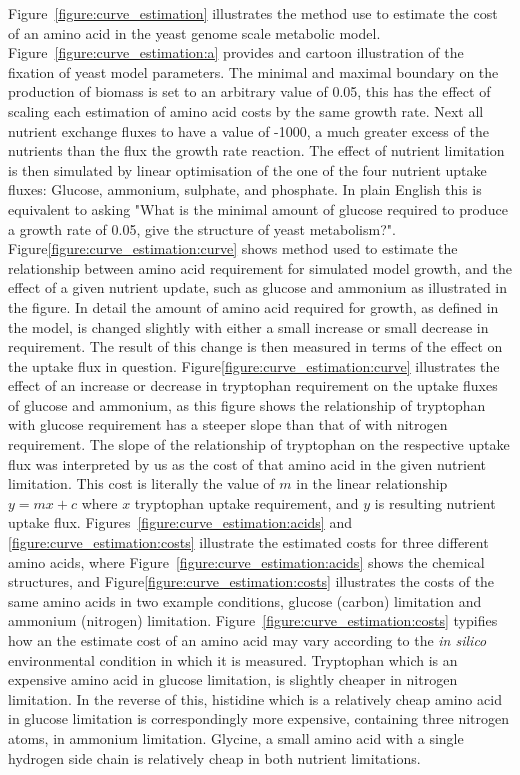Figure~\vref{figure:curve_estimation} illustrates the method use to estimate the cost of an amino acid in the yeast genome scale metabolic model. Figure~\vref{figure:curve_estimation:a} provides and cartoon illustration of the fixation of yeast model parameters. The minimal and maximal boundary on the production of biomass is set to an arbitrary value of 0.05, this has the effect of scaling each estimation of amino acid costs by the same growth rate. Next all nutrient exchange fluxes to have a value of -1000, a much greater excess of the nutrients than the flux the growth rate reaction. The effect of nutrient limitation is then simulated by linear optimisation of the one of the four nutrient uptake fluxes: Glucose, ammonium, sulphate, and phosphate. In plain English this is equivalent to asking "What is the minimal amount of glucose required to produce a growth rate of 0.05, give the structure of yeast metabolism?". Figure\vref{figure:curve_estimation:curve} shows method used to estimate the relationship between amino acid requirement for simulated model growth, and the effect of a given nutrient update, such as glucose and ammonium as illustrated in the figure. In detail the amount of amino acid required for growth, as defined in the model, is changed slightly with either a small increase or small decrease in requirement. The result of this change is then measured in terms of the effect on the uptake flux in question. Figure\vref{figure:curve_estimation:curve} illustrates the effect of an increase or decrease in tryptophan requirement on the uptake fluxes of glucose and ammonium, as this figure shows the relationship of tryptophan with glucose requirement has a steeper slope than that of with nitrogen requirement. The slope of the relationship of tryptophan on the respective uptake flux was interpreted by us as the cost of that amino acid in the given nutrient limitation. This cost is literally the value of $m$ in the linear relationship $y = mx + c$ where $x$ tryptophan uptake requirement, and $y$ is resulting nutrient uptake flux. Figures~\vref{figure:curve_estimation:acids} and \vref{figure:curve_estimation:costs} illustrate the estimated costs for three different amino acids, where Figure~\vref{figure:curve_estimation:acids} shows the chemical structures, and Figure\vref{figure:curve_estimation:costs} illustrates the costs of the same amino acids in two example conditions, glucose (carbon) limitation and ammonium (nitrogen) limitation. Figure~\vref{figure:curve_estimation:costs} typifies how an the estimate cost of an amino acid may vary according to the \emph{in silico} environmental condition in which it is measured. Tryptophan which is an expensive amino acid in glucose limitation, is slightly cheaper in nitrogen limitation. In the reverse of this, histidine which is a relatively cheap amino acid in glucose limitation is correspondingly more expensive, containing three nitrogen atoms, in ammonium limitation. Glycine, a small amino acid with a single hydrogen side chain is relatively cheap in both nutrient limitations.

